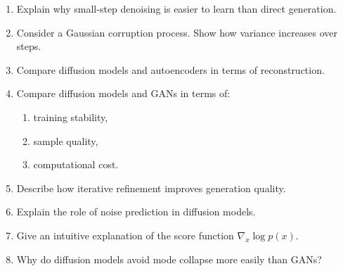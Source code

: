 \begin{enumerate}
    \item Explain why small-step denoising is easier to learn than direct generation.

    \item Consider a Gaussian corruption process. Show how variance increases over steps.

    \item Compare diffusion models and autoencoders in terms of reconstruction.

    \item Compare diffusion models and GANs in terms of:
    \begin{enumerate}
        \item training stability,
        \item sample quality,
        \item computational cost.
    \end{enumerate}

    \item Describe how iterative refinement improves generation quality.

    \item Explain the role of noise prediction in diffusion models.

    \item Give an intuitive explanation of the score function $\nabla_x \log p(x)$.

    \item Why do diffusion models avoid mode collapse more easily than GANs?
\end{enumerate}